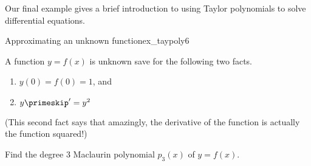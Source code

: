 %
Our final example gives a brief introduction to using Taylor polynomials to solve differential equations.\\


\begin{example}{Approximating an unknown function}{ex_taypoly6}
{
A function $y=f(x)$ is unknown save for the following two facts.
\begin{enumerate}
\item		$y(0) = f(0) = 1$, and
\item		$y\primeskip'= y^2$
\end{enumerate}
(This second fact says that amazingly, the derivative of the function is actually the function squared!)

Find the degree 3 Maclaurin polynomial $p_3(x)$ of $y=f(x)$.
}
\end{example}


